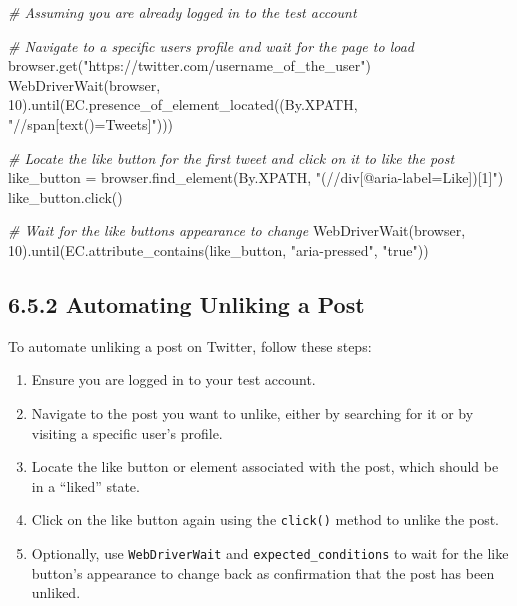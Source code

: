 \documentclass[
  paper=a4,
  ,captions=tableheading
]{scrartcl}
\newenvironment{Shaded}{}{}
\newcommand{\CommentTok}[1]{\textcolor[rgb]{0.38,0.63,0.69}{\textit{#1}}}
\newcommand{\DecValTok}[1]{\textcolor[rgb]{0.25,0.63,0.44}{#1}}
\newcommand{\NormalTok}[1]{#1}
\newcommand{\OperatorTok}[1]{\textcolor[rgb]{0.40,0.40,0.40}{#1}}
\newcommand{\StringTok}[1]{\textcolor[rgb]{0.25,0.44,0.63}{#1}}
\providecommand{\tightlist}{%
  \setlength{\itemsep}{0pt}\setlength{\parskip}{0pt}}
\begin{document}
\begin{Shaded}
\begin{Highlighting}[]
\CommentTok{\# Assuming you are already logged in to the test account}

\CommentTok{\# Navigate to a specific user\textquotesingle{}s profile and wait for the page to load}
\NormalTok{browser.get(}\StringTok{"https://twitter.com/username\_of\_the\_user"}\NormalTok{)}
\NormalTok{WebDriverWait(browser, }\DecValTok{10}\NormalTok{).until(EC.presence\_of\_element\_located((By.XPATH, }\StringTok{"//span[text()=\textquotesingle{}Tweets\textquotesingle{}]"}\NormalTok{)))}

\CommentTok{\# Locate the like button for the first tweet and click on it to like the post}
\NormalTok{like\_button }\OperatorTok{=}\NormalTok{ browser.find\_element(By.XPATH, }\StringTok{"(//div[@aria{-}label=\textquotesingle{}Like\textquotesingle{}])[1]"}\NormalTok{)}
\NormalTok{like\_button.click()}

\CommentTok{\# Wait for the like button\textquotesingle{}s appearance to change}
\NormalTok{WebDriverWait(browser, }\DecValTok{10}\NormalTok{).until(EC.attribute\_contains(like\_button, }\StringTok{"aria{-}pressed"}\NormalTok{, }\StringTok{"true"}\NormalTok{))}
\end{Highlighting}
\end{Shaded}

\hypertarget{automating-unliking-a-post}{%
\subsection{6.5.2 Automating Unliking a
Post}\label{automating-unliking-a-post}}

To automate unliking a post on Twitter, follow these steps:

\begin{enumerate}
\def\labelenumi{\arabic{enumi}.}
\tightlist
\item
  Ensure you are logged in to your test account.
\item
  Navigate to the post you want to unlike, either by searching for it or
  by visiting a specific user's profile.
\item
  Locate the like button or element associated with the post, which
  should be in a ``liked'' state.
\item
  Click on the like button again using the \texttt{click()} method to
  unlike the post.
\item
  Optionally, use \texttt{WebDriverWait} and
  \texttt{expected\_conditions} to wait for the like button's appearance
  to change back as confirmation that the post has been unliked.
\end{enumerate}
\end{document}
